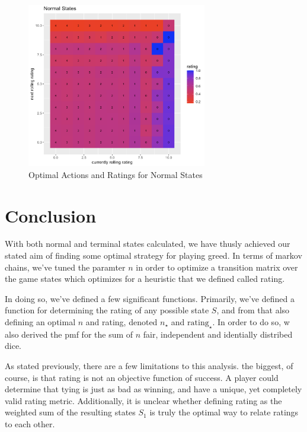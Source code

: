 \documentclass[a4paper]{article}
\begin{document}
\begin{figure}[h]
    \centering
    \includegraphics[width=0.7\textwidth]{Screenshot 2023-12-12 at 20.22.15.png}
    \caption{Optimal Actions and Ratings for Normal States}
\end{figure}


\section{Conclusion}


With both normal and terminal states calculated, we have thusly achieved our stated aim of finding some optimal strategy for playing greed. In terms of markov chains, we've tuned the paramter $n$ in order to optimize a transition matrix over the game states which optimizes for a heuristic that we defined called rating. 


In doing so, we've defined a few significant functions. Primarily, we've defined a function for determining the rating of any possible state $S$, and from that also defining an optimal $n$ and rating, denoted $n_{\star}$ and $\text{rating}_{\star}$. In order to do so, w also derived the pmf for the sum of $n$ fair, independent and identially distribed dice. 


As stated previously, there are a few limitations to this analysis. the biggest, of course, is that rating is not an objective function of success. A player could determine that tying is just as bad as winning, and have a unique, yet completely valid rating metric. Additionally, it is unclear whether defining rating as the weighted sum of the resulting states $S_1$ is truly the optimal way to relate ratings to each other. 
\end{document}
